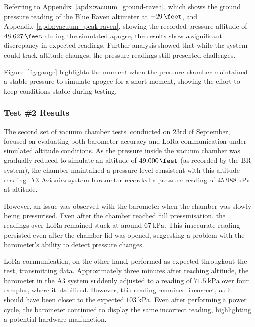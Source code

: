 Referring to Appendix~\ref{apdx:vacuum_ground-raven}, which shows the ground pressure reading of the Blue Raven altimeter at $\qty{-29}{\feet}$, and Appendix~\ref{apdx:vacuum_peak-raven}, showing the recorded pressure altitude of $\qty{48,627}{\feet}$ during the simulated apogee, the results show a significant discrepancy in expected readings. Further analysis showed that while the system could track altitude changes, the pressure readings still presented challenges. 

Figure~\ref{fig:gauge} highlights the moment when the pressure chamber maintained a stable pressure to simulate apogee for a short moment, showing the effort to keep conditions stable during testing.

\subsubsection{Test \#2 Results}
The second set of vacuum chamber tests, conducted on 23rd of September, focused on evaluating both barometer accuracy and LoRa communication under simulated altitude conditions. As the pressure inside the vacuum chamber was gradually reduced to simulate an altitude of $\qty{49,000}{\feet}$ (as recorded by the BR system), the chamber maintained a pressure level consistent with this altitude reading. A3 Avionics system barometer recorded a pressure reading of $\qty{45.988}{\kilo\pascal}$ at altitude.  

However, an issue was observed with the barometer when the chamber was slowly being pressurised. Even after the chamber reached full pressurisation, the readings over LoRa remained stuck at around $\qty{67}{\kilo\pascal}$. This inaccurate reading persisted even after the chamber lid was opened, suggesting a problem with the barometer’s ability to detect pressure changes. 

LoRa communication, on the other hand, performed as expected throughout the test, transmitting data. Approximately three minutes after reaching altitude, the barometer in the A3 system suddenly adjusted to a reading of $\qty{71.5}{\kilo\pascal}$ over four samples, where it stabilised. However, this reading remained incorrect, as it should have been closer to the expected $\qty{103}{\kilo\pascal}$. Even after performing a power cycle, the barometer continued to display the same incorrect reading, highlighting a potential hardware malfunction. 

